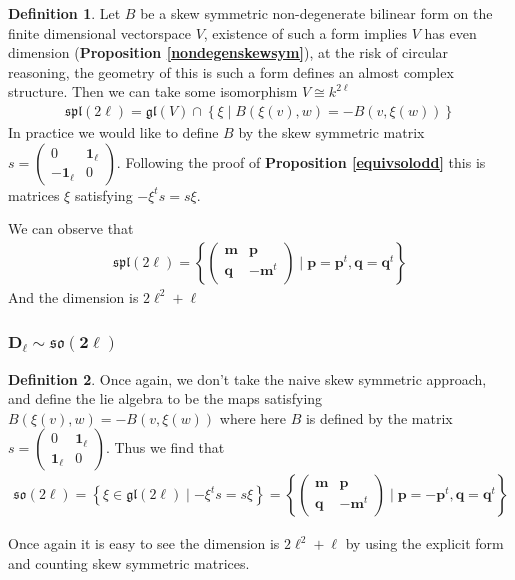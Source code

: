 \documentclass[10.5pt]{article}
\theoremstyle{definition}
\newtheorem{definition}{Definition}
\numberwithin{example}{subsection}
\numberwithin{proposition}{subsection}
\numberwithin{pb}{subsection}
\newcommand{\set}[1]{\left\{#1\right\}}
\begin{document}
    \begin{definition}\label{defspeven}
        Let \(B\) be a skew symmetric non-degenerate bilinear form on the finite dimensional vectorspace \(V\), existence of such a form implies \(V\) has even dimension (\textbf{Proposition \ref{nondegenskewsym}}), at the risk of circular reasoning, the geometry of this is such a form defines an almost complex structure. Then we can take some isomorphism \(V \cong k^{2\ell}\)
        \begin{align}
            \mathfrak{spl}(2\ell) = \mathfrak{gl}(V)\cap\set{\xi \mid B(\xi(v),w) = -B(v,\xi(w))}
        \end{align}
        In practice we would like to define \(B\) by the skew symmetric matrix \(s = \begin{pmatrix} 0 & \mathbf{1_\ell} \\ -\mathbf{1_\ell} & 0 \end{pmatrix}\). Following the proof of \textbf{Proposition \ref{equivsolodd}} this is matrices \(\xi\) satisfying \(-\xi^t s = s \xi\).
    \end{definition}
    We can observe that
    \begin{align}
        \mathfrak{spl}(2\ell) = \set{\begin{pmatrix} \mathbf{m} & \mathbf{p} \\ \mathbf{q} & -\mathbf{m}^t \end{pmatrix}\mid \mathbf{p} = \mathbf{p}^t, \mathbf{q} = \mathbf{q}^t}
    \end{align}
    And the dimension is \(2 \ell^2 + \ell\)

    \subsubsection{\(\mathbf{D_\ell \sim \mathfrak{so}(2\ell)}\)}
    \begin{definition}\label{defsoleven}
        Once again, we don't take the naive skew symmetric approach, and define the lie algebra to be the maps satisfying \(B(\xi(v),w) = -B(v,\xi(w))\) where here \(B\) is defined by the matrix \(s = \begin{pmatrix} 0 & \mathbf{1_\ell} \\ \mathbf{1_\ell} & 0 \end{pmatrix}\). Thus we find that
        \begin{align}
            \mathfrak{so}(2\ell) = \set{\xi \in \mathfrak{gl}(2\ell) \mid -\xi^t s = s\xi} = \set{\begin{pmatrix} \mathbf{m} & \mathbf{p}\\\mathbf{q} & -\mathbf{m}^t \end{pmatrix} \mid \mathbf{p} = -\mathbf{p}^t,\mathbf{q} = \mathbf{q}^t}
        \end{align}
    \end{definition}
    Once again it is easy to see the dimension is \(2\ell^2 + \ell\) by using the explicit form and counting skew symmetric matrices.
\end{document}
